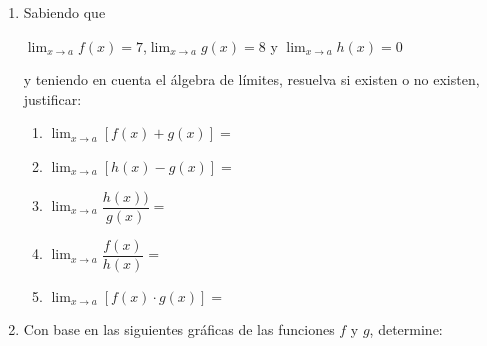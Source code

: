 \documentclass[letterpaper]{article}
\let\ds\displaystyle
\begin{document}
\begin{enumerate}
 \item Sabiendo que
 \newpage
\begin{center}
$\ds{\lim_{x\rightarrow a}f(x)=7}$,\quad  $\ds{\lim_{x\rightarrow a}g(x)=8}$ \quad y \quad $\ds{\lim_{x\rightarrow a}h(x)=0}$ 
\end{center}
y teniendo en cuenta el álgebra de límites, resuelva si existen o no existen, justificar:
      \begin{enumerate}
	 \item $\ds{\lim_{x\rightarrow a}[f(x)+g(x)]}=$
	 \item $\ds{\lim_{x\rightarrow a}[h(x)-g(x)]}=$
	 \item $\ds{\lim_{x\rightarrow a}\dfrac{h(x))}{g(x)}}=$
	 \item $\ds{\lim_{x\rightarrow a}\dfrac{f(x)}{h(x)}}=$
	 \item $\ds{\lim_{x\rightarrow a}[f(x)\cdot g(x)]}=$
      \end{enumerate}
   \item Con base en las siguientes gráficas de las funciones $f$ y $g$, determine:
   

\end{enumerate}
\end{document}
